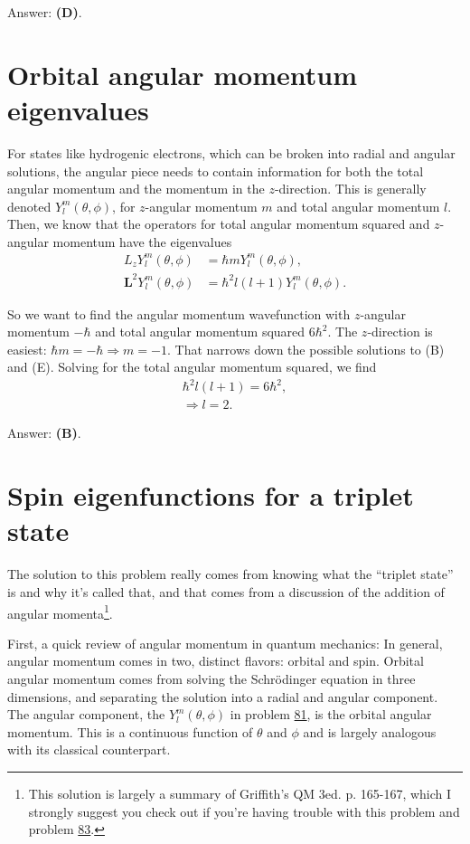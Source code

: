 \documentclass[11pt]{paper}
\newcommand{\answer}[1]{Answer: \textbf{(#1)}.}
\begin{document}
\answer{D}

\section{Orbital angular momentum eigenvalues}

For states like hydrogenic electrons, which can be broken into radial and angular solutions, the angular piece needs to contain information for both the total angular momentum and the momentum in the $z$-direction.  This is generally denoted $Y^m_l(\theta,\phi)$, for $z$-angular momentum $m$ and total angular momentum $l$.  Then, we know that the operators for total angular momentum squared and $z$-angular momentum have the eigenvalues
\begin{align}
L_zY^m_l(\theta,\phi) &= \hbar m Y^m_l(\theta,\phi),\\
\mathbf{L}^2Y^m_l(\theta,\phi) &= \hbar^2 l(l+1)Y^m_l(\theta,\phi).
\end{align}

So we want to find the angular momentum wavefunction with $z$-angular momentum $-\hbar$ and total angular momentum squared $6\hbar^2$.  The $z$-direction is easiest: $\hbar m = -\hbar\Rightarrow m=-1$.  That narrows down the possible solutions to (B) and (E).  Solving for the total angular momentum squared, we find
\begin{align}
\hbar^2 l(l+1) = 6\hbar^2,\\
\Rightarrow l =2.
\end{align}

\answer{B}

\section{Spin eigenfunctions for a triplet state}
The solution to this problem really comes from knowing what the ``triplet state'' is and why it's called that, and that comes from a discussion of the addition of angular momenta\footnote{This solution is largely a summary of Griffith's QM 3ed. p. 165-167, which I strongly suggest you check out if you're having trouble with this problem and problem \hyperlink{section.83}{83}.}.

First, a quick review of angular momentum in quantum mechanics:  In general, angular momentum comes in two, distinct flavors: orbital and spin.  Orbital angular momentum comes from solving the Schr\"{o}dinger equation in three dimensions, and separating the solution into a radial and angular component.  The angular component, the $Y_l^m(\theta,\phi)$ in problem \hyperlink{section.81}{81}, is the orbital angular momentum.  This is a continuous function of $\theta$ and $\phi$ and is largely analogous with its classical counterpart.
\end{document}
